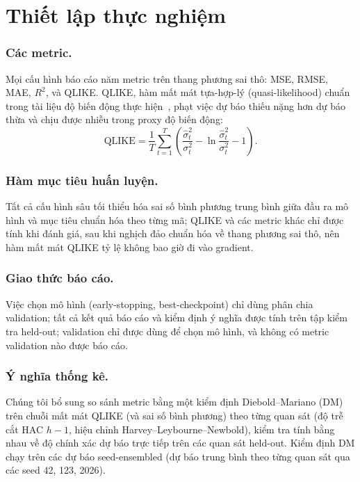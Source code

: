 \documentclass[runningheads]{llncs}
\begin{document}
\section{Thiết lập thực nghiệm}
\label{sec:setup}

\subsubsection{Các metric.}
Mọi cấu hình báo cáo năm metric trên thang phương sai thô: MSE, RMSE, MAE, $R^2$, và QLIKE. QLIKE, hàm
mất mát tựa-hợp-lý (quasi-likelihood) chuẩn trong tài liệu độ biến động thực hiện~\cite{patton2011}, phạt
việc dự báo thiếu nặng hơn dự báo thừa và chịu được nhiễu trong proxy độ biến động:
\begin{equation}
\text{QLIKE} = \frac{1}{T}\sum_{t=1}^{T}\left(\frac{\hat{\sigma}^2_t}{\sigma^2_t}
 - \ln\frac{\hat{\sigma}^2_t}{\sigma^2_t} - 1\right).
\label{eq:qlike}
\end{equation}

\subsubsection{Hàm mục tiêu huấn luyện.}
Tất cả cấu hình sâu tối thiểu hóa sai số bình phương trung bình giữa đầu ra mô hình và mục tiêu chuẩn hóa
theo từng mã; QLIKE và các metric khác chỉ được tính khi đánh giá, sau khi nghịch đảo chuẩn hóa về thang
phương sai thô, nên hàm mất mát QLIKE tỷ lệ không bao giờ đi vào gradient.

\subsubsection{Giao thức báo cáo.}
Việc chọn mô hình (early-stopping, best-checkpoint) chỉ dùng phân chia validation; tất cả kết quả báo cáo
và kiểm định ý nghĩa được tính trên tập kiểm tra held-out; validation chỉ được dùng để chọn mô hình, và
không có metric validation nào được báo cáo.

\subsubsection{Ý nghĩa thống kê.}
Chúng tôi bổ sung so sánh metric bằng một kiểm định Diebold--Mariano (DM) trên chuỗi mất mát QLIKE (và
sai số bình phương) theo từng quan sát (độ trễ cắt HAC $h{-}1$, hiệu chỉnh Harvey--Leybourne--Newbold),
kiểm tra tính bằng nhau về độ chính xác dự báo trực tiếp trên các quan sát held-out. Kiểm định DM chạy
trên các dự báo seed-ensembled (dự báo trung bình theo từng quan sát qua các seed 42, 123, 2026).
\end{document}
